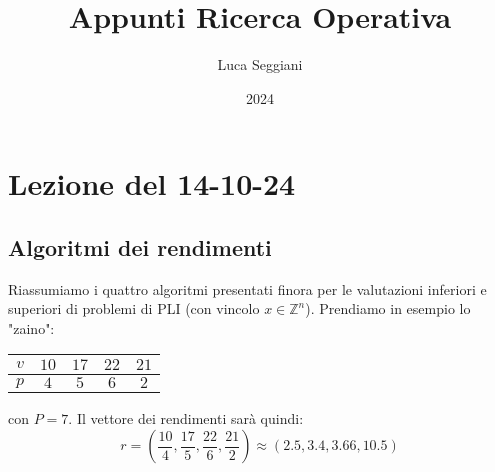 \documentclass[a4paper,11pt]{article}
\title{Appunti Ricerca Operativa}
\author{Luca Seggiani}
\date{2024}
\begin{document}
\section{Lezione del 14-10-24}

\thispagestyle{empty}
\pagestyle{fancy}

\subsection{Algoritmi dei rendimenti}
Riassumiamo i quattro algoritmi presentati finora per le valutazioni inferiori e superiori di problemi di PLI (con vincolo $x \in \mathbb{Z}^n$). 
Prendiamo in esempio lo "zaino":\begin{table}[h!]
	\center 
	\begin{tabular} { c | c c c c }
		$v$ & $10$ & $17$ & $22$ & $21$ \\
		\hline 
		$p$ & $4$ & $5$ & $6$ & $2$ \\
	\end{tabular}
\end{table}
con $P = 7$.
Il vettore dei rendimenti sarà quindi:
$$
r = \left( \frac{10}{4}, \frac{17}{5}, \frac{22}{6}, \frac{21}{2} \right) \approx (2.5, 3.4, 3.66, 10.5)
$$
\end{document}
